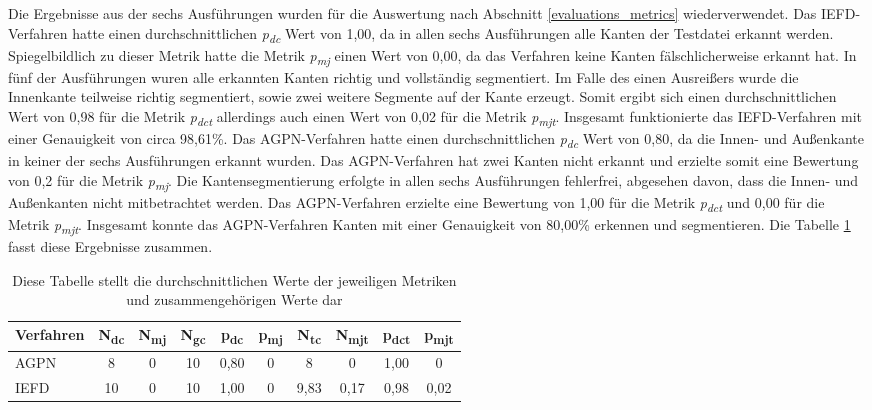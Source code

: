 Die Ergebnisse aus der sechs Ausführungen wurden für die Auswertung nach Abschnitt \ref{evaluations_metrics} wiederverwendet. Das IEFD-Verfahren hatte einen durchschnittlichen \textit{p\textsubscript{dc}} Wert von 1,00, da in allen sechs Ausführungen alle Kanten der Testdatei erkannt werden. Spiegelbildlich zu dieser Metrik hatte die Metrik \textit{p\textsubscript{mj}} einen Wert von 0,00, da das Verfahren keine Kanten fälschlicherweise erkannt hat. In fünf der Ausführungen wuren alle erkannten Kanten richtig und vollständig segmentiert. Im Falle des einen Ausreißers wurde die Innenkante teilweise richtig segmentiert, sowie zwei weitere Segmente auf der Kante erzeugt. Somit ergibt sich einen durchschnittlichen Wert von 0,98 für die Metrik \textit{p\textsubscript{dct}} allerdings auch einen Wert von 0,02 für die Metrik \textit{p\textsubscript{mjt}}. Insgesamt funktionierte das IEFD-Verfahren mit einer Genauigkeit von circa 98,61\%. Das AGPN-Verfahren hatte einen durchschnittlichen \textit{p\textsubscript{dc}} Wert von 0,80, da die Innen- und Außenkante in keiner der sechs Ausführungen erkannt wurden. Das AGPN-Verfahren hat zwei Kanten nicht erkannt und erzielte somit eine Bewertung von 0,2 für die Metrik \textit{p\textsubscript{mj}}. Die Kantensegmentierung erfolgte in allen sechs Ausführungen fehlerfrei, abgesehen davon, dass die Innen- und Außenkanten nicht mitbetrachtet werden. Das AGPN-Verfahren erzielte eine Bewertung von 1,00 für die Metrik \textit{p\textsubscript{dct}} und 0,00 für die Metrik \textit{p\textsubscript{mjt}}. Insgesamt konnte das AGPN-Verfahren Kanten mit einer Genauigkeit von 80,00\% erkennen und segmentieren. Die Tabelle \ref{table: metric_values} fasst diese Ergebnisse zusammen.

\begin{table}[h]
	\centering
	\begin{tabular}{l *{9}{c}}
		\hline
		\textbf{Verfahren} & \textbf{N\textsubscript{dc}} & \textbf{N\textsubscript{mj}} & \textbf{N\textsubscript{gc}} & \textbf{p\textsubscript{dc}} & \textbf{p\textsubscript{mj}} & \textbf{N\textsubscript{tc}} & \textbf{N\textsubscript{mjt}} & \textbf{p\textsubscript{dct}} & \textbf{p\textsubscript{mjt}} \\
		\hline
		AGPN & 8 & 0 & 10 & 0,80 & 0 & 8 & 0 & 1,00 & 0 \\
		IEFD & 10 & 0 & 10 & 1,00 & 0 & 9,83 & 0,17 & 0,98 & 0,02 \\
		\hline
	\end{tabular}
	\caption{Diese Tabelle stellt die durchschnittlichen Werte der jeweiligen Metriken und zusammengehörigen Werte dar}
	\label{table: metric_values}
\end{table}


